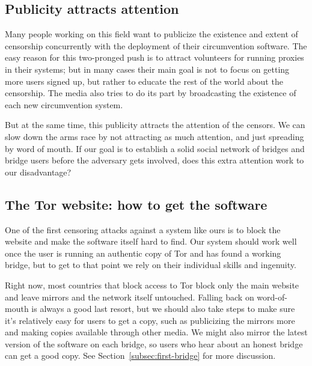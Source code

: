 \documentclass{llncs}
\begin{document}


\subsection{Publicity attracts attention}
\label{subsec:publicity}

Many people working on this field want to publicize the existence
and extent of censorship concurrently with the deployment of their
circumvention software. The easy reason for this two-pronged push is
to attract volunteers for running proxies in their systems; but in many
cases their main goal is not to focus on getting more users signed up,
but rather to educate the rest of the world about the
censorship. The media also tries to do its part by broadcasting the
existence of each new circumvention system.

But at the same time, this publicity attracts the attention of the
censors. We can slow down the arms race by not attracting as much
attention, and just spreading by word of mouth. If our goal is to
establish a solid social network of bridges and bridge users before
the adversary gets involved, does this extra attention work to our
disadvantage?

\subsection{The Tor website: how to get the software}

One of the first censoring attacks against a system like ours is to
block the website and make the software itself hard to find. Our system
should work well once the user is running an authentic
copy of Tor and has found a working bridge, but to get to that point
we rely on their individual skills and ingenuity.

Right now, most countries that block access to Tor block only the main
website and leave mirrors and the network itself untouched.
Falling back on word-of-mouth is always a good last resort, but we should
also take steps to make sure it's relatively easy for users to get a copy,
such as publicizing the mirrors more and making copies available through
other media. We might also mirror the latest version of the software on
each bridge, so users who hear about an honest bridge can get a good
copy.
See Section~\ref{subsec:first-bridge} for more discussion.
\end{document}
